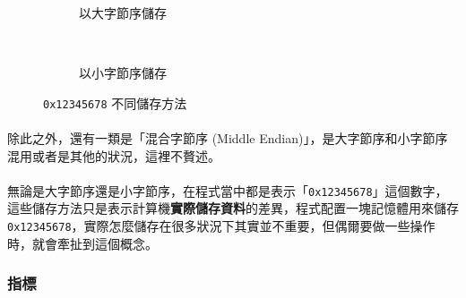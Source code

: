 \documentclass[12pt,a4paper,oneside]{article}
\begin{document}
\begin{CJK}{UTF8}{bkai}
\begin{figure}[h!]
\centering
\begin{subfigure}{0.4\textwidth}
  \centering
  \caption{以大字節序儲存}
  \label{program:struct:fig:big:endian}
\end{subfigure}
~
\begin{subfigure}{0.4\textwidth}
  \centering
  \caption{以小字節序儲存}
  \label{program:struct:fig:little:endian}
\end{subfigure}
\caption{\texttt{0x12345678} 不同儲存方法}
\label{program:struct:fig:big:little:endian}
\end{figure}

\paragraph{}除此之外，還有一類是「混合字節序 (Middle Endian)」，是大字節序和小字節序混用或者是其他的狀況，這裡不贅述。
\paragraph{}無論是大字節序還是小字節序，在程式當中都是表示「\texttt{0x12345678}」這個數字，這些儲存方法只是表示計算機\textbf{實際儲存資料}的差異，程式配置一塊記憶體用來儲存 \texttt{0x12345678}，實際怎麼儲存在很多狀況下其實並不重要，但偶爾要做一些操作時，就會牽扯到這個概念。

\subsubsection{指標}


\end{CJK}
\end{document}
